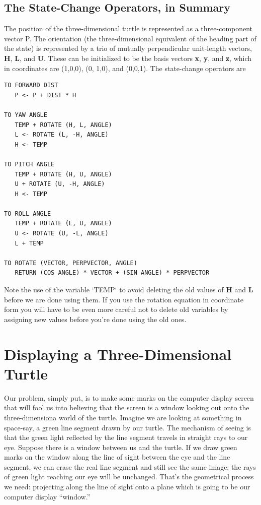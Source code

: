 \documentclass{book}
\begin{document}
\subsection{The State-Change Operators, in Summary}

The position of the three-dimensional turtle is represented as a three-component vector P. The orientation (the three-dimensional equivalent
of the heading part of the state) is represented by a trio of mutually
perpendicular unit-length vectors, \textbf{H}, \textbf{L}, and \textbf{U}. These can be initialized
to be the basis vectors \textbf{x}, \textbf{y}, and \textbf{z}, which in coordinates are (1,0,0),
(0, 1,0), and (0,0,1). The state-change operators are

\begin{verbatim}
TO FORWARD DIST
   P <- P + DIST * H

TO YAW ANGLE
   TEMP + ROTATE (H, L, ANGLE)
   L <- ROTATE (L, -H, ANGLE)
   H <- TEMP

TO PITCH ANGLE
   TEMP + ROTATE (H, U, ANGLE)
   U + ROTATE (U, -H, ANGLE)
   H <- TEMP

TO ROLL ANGLE
   TEMP + ROTATE (L, U, ANGLE)
   U <- ROTATE (U, -L, ANGLE)
   L + TEMP

TO ROTATE (VECTOR, PERPVECTOR, ANGLE)
   RETURN (COS ANGLE) * VECTOR + (SIN ANGLE) * PERPVECTOR
\end{verbatim}
Note the use of the variable \textsc{`TEMP`} to avoid deleting the old values of \textbf{H}
and \textbf{L} before we are done using them. If you use the rotation equation
in coordinate form you will have to be even more careful not to delete
old variables by assigning new values before you're done using the old
ones.

\section{Displaying a Three-Dimensional Turtle}

Our problem, simply put, is to make some marks on the computer
display screen that will fool us into believing that the screen is a window
looking out onto the three-dimensiona world of the turtle. Imagine we
are looking at something in space-say, a green line segment drawn by
our turtle. The mechanism of seeing is that the green light reflected by
the line segment travels in straight rays to our eye. Suppose there is
a window between us and the turtle. If we draw green marks on the
window along the line of sight between the eye and the line segment, we
can erase the real line segment and still see the same image; the rays of
green light reaching our eye will be unchanged. That's the geometrical
process we need: projecting along the line of sight onto a plane which is
going to be our computer display ``window.''
\end{document}
